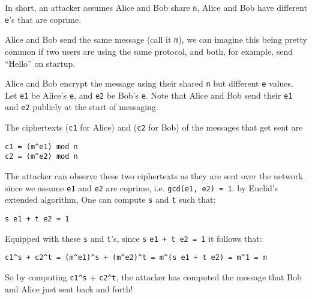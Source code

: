 \documentclass[11pt]{article}
\begin{document}
In short, an attacker assumes Alice and Bob share \verb|n|, Alice and Bob have different \verb|e|’s that are coprime.

Alice and Bob send the same message (call it \verb|m|), we can imagine this being pretty common if two users are using the same protocol, and both, for example, send “Hello” on startup.

Alice and Bob encrypt the message using their shared \verb|n| but different \verb|e| values. Let \verb|e1| be Alice’s \verb|e|, and \verb|e2| be Bob’s \verb|e|. Note that Alice and Bob send their \verb|e1| and \verb|e2| publicly at the start of messaging.

The ciphertexts (\verb|c1| for Alice) and (\verb|c2| for Bob) of the messages that get sent are

\begin{verbatim}
c1 = (m^e1) mod n 
c2 = (m^e2) mod n
\end{verbatim}

The attacker can observe these two ciphertexts as they are sent over the network.
since we assume \verb|e1| and \verb|e2| are coprime, i.e. \verb|gcd(e1, e2) = 1|. by Euclid's extended algorithm, 
One can compute \verb|s| and \verb|t| such that:

\begin{verbatim}
s e1 + t e2 = 1
\end{verbatim}

Equipped with these \verb|s| and \verb|t|’s, since \verb|s| \verb|e1 + t e2 = 1| it follows that:
\begin{verbatim}
c1^s + c2^t = (m^e1)^s + (m^e2)^t = m^(s e1 + t e2) = m^1 = m
\end{verbatim}

So by computing \verb|c1^s| + \verb|c2^t|, the attacker has computed the message that Bob and Alice just sent back and forth!
\end{document}
